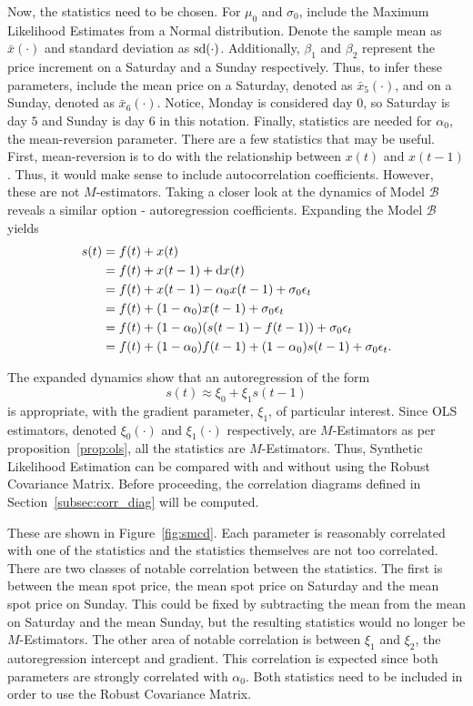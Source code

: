 Now, the statistics need to be chosen. For $\mu_0$ and $\sigma_0$, include the Maximum Likelihood Estimates from a Normal distribution. Denote the sample mean as $\bar{x}(\cdot)$ and standard deviation as $\mathop{}\!\text{sd}{(\cdot)}$. Additionally, $\beta_1$ and $\beta_2$ represent the price increment on a Saturday and a Sunday respectively. Thus, to infer these parameters, include the mean price on a Saturday, denoted as $\bar{x}_5(\cdot)$, and on a Sunday, denoted as $\bar{x}_6(\cdot)$. Notice, Monday is considered day $0$, so Saturday is day $5$ and Sunday is day $6$ in this notation. Finally, statistics are needed for $\alpha_0$, the mean-reversion parameter. There are a few statistics that may be useful. First, mean-reversion is to do with the relationship between $x(t)$ and $x(t-1)$. Thus, it would make sense to include autocorrelation coefficients. However, these are not $M$-estimators. Taking a closer look at the dynamics of Model $\mathcal{B}$ reveals a similar option - autoregression coefficients. Expanding the Model $\mathcal{B}$ yields
\begin{align}
    s(t) &= f(t) + x(t) \\
    &= f(t) + x(t-1) + \mathop{}\!\mathrm{d}{x(t)} \\
    &= f(t) + x(t-1) - \alpha_0 x(t-1) + \sigma_0 \epsilon_t \\
    &= f(t) + (1-\alpha_0)x(t-1) + \sigma_0 \epsilon_t \\
    &= f(t) + (1-\alpha_0)(s(t-1) - f(t-1)) + \sigma_0 \epsilon_t \\
    &= f(t) + (1-\alpha_0)f(t-1) + (1-\alpha_0)s(t-1) + \sigma_0 \epsilon_t.
\end{align}

The expanded dynamics show that an autoregression of the form
\begin{equation}
    s(t) \approx \xi_0 + \xi_1 s(t-1)
\end{equation}
is appropriate, with the gradient parameter, $\xi_1$, of particular interest. Since OLS estimators, denoted $\xi_0(\cdot)$ and $\xi_1(\cdot)$ respectively, are $M$-Estimators as per proposition~\ref{prop:ols}, all the statistics are $M$-Estimators. Thus, Synthetic Likelihood Estimation can be compared with and without using the Robust Covariance Matrix. Before proceeding, the correlation diagrams defined in Section~\ref{subsec:corr_diag} will be computed.

These are shown in Figure~\ref{fig:smcd}. Each parameter is reasonably correlated with one of the statistics and the statistics themselves are not too correlated. There are two classes of notable correlation between the statistics. The first is between the mean spot price, the mean spot price on Saturday and the mean spot price on Sunday. This could be fixed by subtracting the mean from the mean on Saturday and the mean Sunday, but the resulting statistics would no longer be $M$-Estimators. The other area of notable correlation is between $\xi_1$ and $\xi_2$, the autoregression intercept and gradient. This correlation is expected since both parameters are strongly correlated with $\alpha_0$. Both statistics need to be included in order to use the Robust Covariance Matrix.

